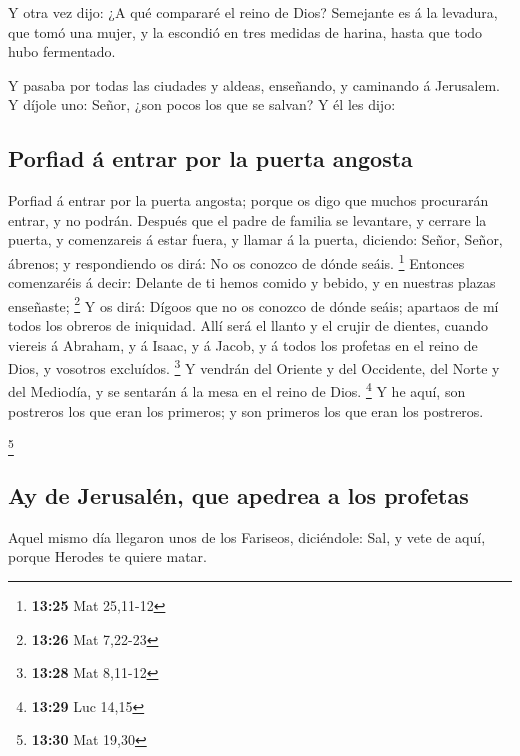 Y otra vez dijo: ¿A qué compararé el reino de Dios?
 Semejante es á la levadura, que tomó una mujer, y la
escondió en tres medidas de harina, hasta que todo hubo fermentado.

 Y pasaba por todas las ciudades y aldeas, enseñando, y
caminando á Jerusalem.  Y díjole uno: Señor, ¿son pocos
los que se salvan? Y él les dijo:

\hypertarget{porfiad-uxe1-entrar-por-la-puerta-angosta}{%
\subsection{Porfiad á entrar por la puerta
angosta}\label{porfiad-uxe1-entrar-por-la-puerta-angosta}}

 Porfiad á entrar por la puerta angosta; porque os digo
que muchos procurarán entrar, y no podrán.  Después que
el padre de familia se levantare, y cerrare la puerta, y comenzareis á
estar fuera, y llamar á la puerta, diciendo: Señor, Señor, ábrenos; y
respondiendo os dirá: No os conozco de dónde seáis. \footnote{\textbf{13:25}
  Mat 25,11-12}  Entonces comenzaréis á decir: Delante de
ti hemos comido y bebido, y en nuestras plazas enseñaste; \footnote{\textbf{13:26}
  Mat 7,22-23}  Y os dirá: Dígoos que no os conozco de
dónde seáis; apartaos de mí todos los obreros de iniquidad.
 Allí será el llanto y el crujir de dientes, cuando
viereis á Abraham, y á Isaac, y á Jacob, y á todos los profetas en el
reino de Dios, y vosotros excluídos. \footnote{\textbf{13:28} Mat
  8,11-12}  Y vendrán del Oriente y del Occidente, del
Norte y del Mediodía, y se sentarán á la mesa en el reino de Dios.
\footnote{\textbf{13:29} Luc 14,15}  Y he aquí, son
postreros los que eran los primeros; y son primeros los que eran los
postreros.

\footnote{\textbf{13:30} Mat 19,30}

\hypertarget{ay-de-jerusaluxe9n-que-apedrea-a-los-profetas}{%
\subsection{Ay de Jerusalén, que apedrea a los
profetas}\label{ay-de-jerusaluxe9n-que-apedrea-a-los-profetas}}

 Aquel mismo día llegaron unos de los Fariseos,
diciéndole: Sal, y vete de aquí, porque Herodes te quiere matar.

